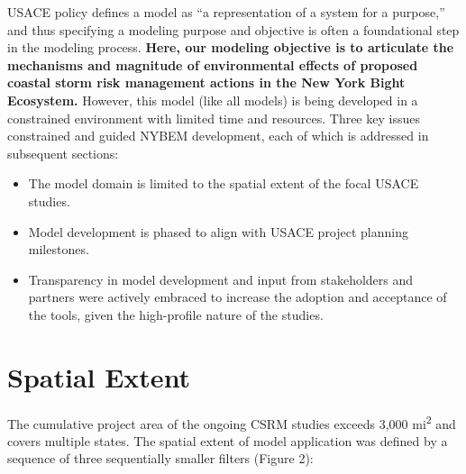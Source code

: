 \documentclass[
]{book}
\begin{document}
USACE policy \citep{us_army_corps_of_engineers_assuring_2011} defines a model as ``a representation of a system for a purpose,'' and thus specifying a modeling purpose and objective is often a foundational step in the modeling process. \textbf{Here, our modeling objective is to articulate the mechanisms and magnitude of environmental effects of proposed coastal storm risk management actions in the New York Bight Ecosystem.} However, this model (like all models) is being developed in a constrained environment with limited time and resources. Three key issues constrained and guided NYBEM development, each of which is addressed in subsequent sections:

\begin{itemize}
\item
  The model domain is limited to the spatial extent of the focal USACE studies.
\item
  Model development is phased to align with USACE project planning milestones.
\item
  Transparency in model development and input from stakeholders and partners were actively embraced to increase the adoption and acceptance of the tools, given the high-profile nature of the studies.
\end{itemize}

\hypertarget{spatial-extent}{%
\section{Spatial Extent}\label{spatial-extent}}

The cumulative project area of the ongoing CSRM studies exceeds 3,000 mi\textsuperscript{2} and covers multiple states. The spatial extent of model application was defined by a sequence of three sequentially smaller filters (Figure 2):
\end{document}
